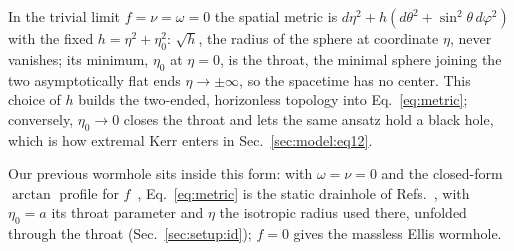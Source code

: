 \documentclass[twocolumn,floatfix,aps,prd,superscriptaddress,nofootinbib]{revtex4-2}
\begin{document}
In the trivial limit $f=\nu=\omega=0$ the spatial metric is $d\eta^2+h\left(d\theta^2+\sin^2\!\theta\,d\varphi^2\right)$ with the fixed $h=\eta^2+\eta_0^2$: $\sqrt{h}$, the radius of the sphere at coordinate $\eta$, never vanishes; its minimum, $\eta_0$ at $\eta=0$, is the throat, the minimal sphere joining the two asymptotically flat ends $\eta\to\pm\infty$, so the spacetime has no center. This choice of $h$ builds the two-ended, horizonless topology into Eq.~\eqref{eq:metric}; conversely, $\eta_0\to0$ closes the throat and lets the same ansatz hold a black hole, which is how extremal Kerr enters in Sec.~\ref{sec:model:eq12}.

Our previous wormhole sits inside this form: with $\omega=\nu=0$ and the closed-form $\arctan$ profile for $f$~\cite{chew2016}, Eq.~\eqref{eq:metric} is the static drainhole of Refs.~\cite{shirokov2026,shirokov2026c}, with $\eta_0=a$ its throat parameter and $\eta$ the isotropic radius used there, unfolded through the throat (Sec.~\ref{sec:setup:id}); $f=0$ gives the massless Ellis wormhole.
\end{document}
